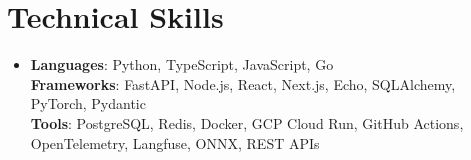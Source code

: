 \documentclass[letterpaper,11pt]{article}
\begin{document}
\section{Technical Skills}
\begin{itemize}[leftmargin=0.15in, label={}, topsep=0pt, itemsep=0pt, parsep=0pt, partopsep=0pt]
  \item{\fontsize{9.6pt}{10.0pt}\selectfont
   \textbf{Languages}{: Python, TypeScript, JavaScript, Go} \\
   \textbf{Frameworks}{: FastAPI, Node.js, React, Next.js, Echo, SQLAlchemy, PyTorch, Pydantic} \\
   \textbf{Tools}{: PostgreSQL, Redis, Docker, GCP Cloud Run, GitHub Actions, OpenTelemetry, Langfuse, ONNX, REST APIs} \\
  }
\end{itemize}
\end{document}
